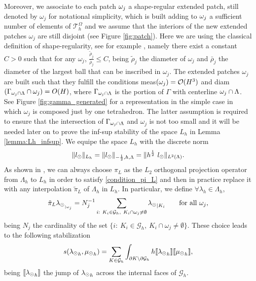 Moreover, we associate to each patch $\omega _j$ a shape-regular extended patch, still denoted by $\omega_j$ for notational simplicity, which is built adding to $\omega _j$ a sufficient number of elements of $\mathcal{T}_h^{\Omega}$ and we assume that the interiors of the new extended patches $\omega _j$ are still disjoint (see Figure \ref{fig:patch}). Here we are using the classical definition of shape-regularity, see for example \cite{MR2050138}, namely there exist a constant $C>0$ such that for any $\omega_j$, $\frac{\tilde{\rho}_j}{\bar{\rho}_j}\leq C$, being $\tilde{\rho}_j$ the diameter of $\omega_j$ and $\bar{\rho}_j$ the diameter of the largest ball that can be inscribed in $\omega_j$. The extended patches $\omega _j$ are built such that they fulfill the conditions meas$(\omega _j)=\mathcal{O}(H^3)$ and diam$(\Gamma_{\omega _j\cap \Lambda}\cap \omega_j)=O(H)$, where $\Gamma_{\omega _j\cap \Lambda}$ is the portion of $\Gamma$ with centerline $\omega _j\cap \Lambda$. See Figure \ref{fig:gamma_generated} for a representation in the simple case in which $\omega _j$ is composed just by one tetrahedron. The latter assumption is required to ensure that the intersection of $\Gamma_{\omega _j\cap \Lambda}$ and $\omega_j$ is not too small and it will be needed later on to prove the inf-sup stability of the space $L_h$ in Lemma \ref{lemma:Lh_infsup}. We equipe the space $L_h$ with the discrete norm 
\begin{equation*}
\|l_{\odot} \|_{L_h} = \|l_{\odot} \|_{-\frac 12, h, \Lambda} = \|h^{\frac 12} \  l_{\odot} \|_{L^2(\Lambda)}.
\end{equation*}
As shown in \cite[Section III]{burman2014}, we can always choose $\pi_L$ as the $L_2$ orthogonal projection operator from $\Lambda_h$ to $L_h$ in order to satisfy \eqref{condition_pi_L} and then in practice replace it with any interpolation $\tilde{\pi}_L$ of $\Lambda_h$ in $L_h$. In particular, we define $\forall \lambda_h \in \Lambda_h$,
\begin{equation*}
\tilde{\pi}_L {\lambda_{\odot}}_{ _{|\omega _j}} = N_j^{-1} \sum_{\substack{i: \ K_i \in \mathcal{G}_h, \  K_i \cap \omega_j \neq \emptyset}} {\lambda_{\odot}}_{|K_i} \qquad \text{for all $\omega_j$,} 
\end{equation*}
being $N_j$ the cardinality of the set $\{i: \ K_i \in \mathcal{G}_h, \  K_i \cap \omega_j \neq \emptyset\}$. These choice leads to the following stabilization 
\begin{equation}\label{eq:stab}
s({\ld}_h, {\md}_h)= \sum _{K\in \mathcal{G}_{h}} \int_{\partial K\setminus \partial \mathcal{G}_{h}} h \llbracket {\ld}_h \rrbracket \llbracket {\md}_h \rrbracket,
\end{equation}
being $\llbracket {\lambda_{\odot}}_h \rrbracket$ the jump of ${\lambda_{\odot}}_h$ across the internal faces of $\mathcal{G}_h$.

